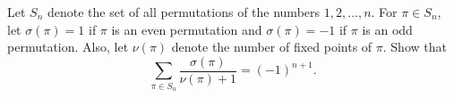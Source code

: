 Let $S_n$ denote the set of all permutations of the numbers $1,2,\dots,n$.
For $\pi \in S_n$, let $\sigma(\pi) = 1$ if $\pi$ is an even permutation
and $\sigma(\pi) = -1$ if $\pi$ is an odd permutation.
Also, let $\nu(\pi)$ denote the number of fixed points of $\pi$.
Show that
\[
\sum_{\pi \in S_n} \frac{\sigma(\pi)}{\nu(\pi) + 1} = (-1)^{n+1}.
\]
